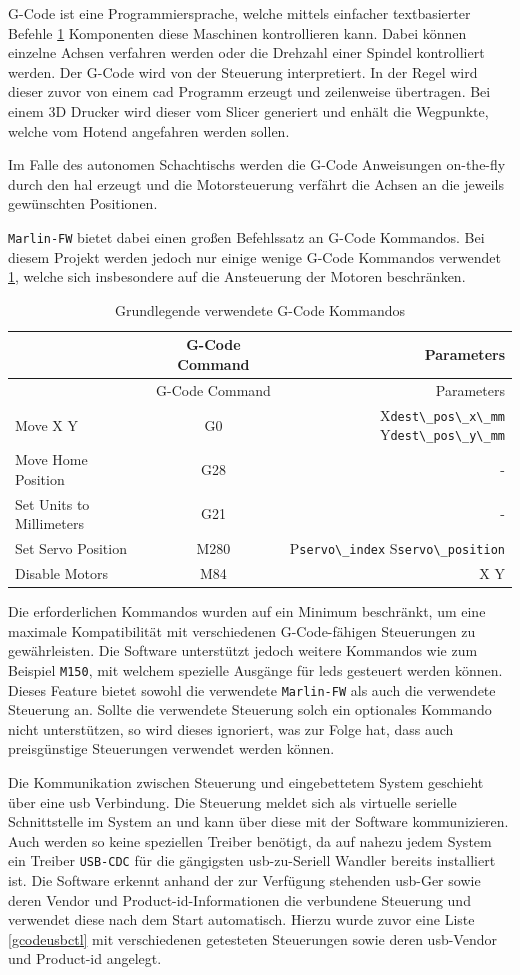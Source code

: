 G-Code ist eine Programmiersprache, welche mittels einfacher
textbasierter Befehle \ref{gcodecmd} Komponenten diese Maschinen
kontrollieren kann. Dabei können einzelne Achsen verfahren werden oder
die Drehzahl einer Spindel kontrolliert werden. Der G-Code wird von der
Steuerung interpretiert. In der Regel wird dieser zuvor von einem
\gls{cad} Programm erzeugt und zeilenweise übertragen. Bei einem 3D
Drucker wird dieser vom Slicer generiert und enhält die Wegpunkte,
welche vom Hotend angefahren werden sollen.

Im Falle des autonomen Schachtischs werden die G-Code Anweisungen
on-the-fly durch den \gls{hal} erzeugt und die Motorsteuerung verfährt
die Achsen an die jeweils gewünschten Positionen.

\passthrough{\lstinline!Marlin-FW!} bietet dabei einen großen
Befehlssatz an G-Code Kommandos. Bei diesem Projekt werden jedoch nur
einige wenige G-Code Kommandos verwendet \ref{gcodecmd}, welche sich
insbesondere auf die Ansteuerung der Motoren beschränken.

\begin{longtable}[]{@{}lcr@{}}
\caption{Grundlegende verwendete G-Code Kommandos
\label{gcodecmd}}\tabularnewline
\toprule
& G-Code Command & Parameters\tabularnewline
\midrule
\endfirsthead
\toprule
& G-Code Command & Parameters\tabularnewline
\midrule
\endhead
Move X Y & G0 & X\passthrough{\lstinline!dest\_pos\_x\_mm!}
Y\passthrough{\lstinline!dest\_pos\_y\_mm!}\tabularnewline
Move Home Position & G28 & -\tabularnewline
Set Units to Millimeters & G21 & -\tabularnewline
Set Servo Position & M280 & P\passthrough{\lstinline!servo\_index!}
S\passthrough{\lstinline!servo\_position!}\tabularnewline
Disable Motors & M84 & X Y\tabularnewline
\bottomrule
\end{longtable}

Die erforderlichen Kommandos wurden auf ein Minimum beschränkt, um eine
maximale Kompatibilität mit verschiedenen G-Code-fähigen Steuerungen zu
gewährleisten. Die Software unterstützt jedoch weitere Kommandos wie zum
Beispiel \passthrough{\lstinline!M150!}, mit welchem spezielle Ausgänge
für \gls{led}s gesteuert werden können. Dieses Feature bietet sowohl die
verwendete \passthrough{\lstinline!Marlin-FW!} als auch die verwendete
Steuerung an. Sollte die verwendete Steuerung solch ein optionales
Kommando nicht unterstützen, so wird dieses ignoriert, was zur Folge
hat, dass auch preisgünstige Steuerungen verwendet werden können.

Die Kommunikation zwischen Steuerung und eingebettetem System geschieht
über eine \gls{usb} Verbindung. Die Steuerung meldet sich als virtuelle
serielle Schnittstelle im System an und kann über diese mit der Software
kommunizieren. Auch werden so keine speziellen Treiber benötigt, da auf
nahezu jedem System ein Treiber \passthrough{\lstinline!USB-CDC!} für
die gängigsten \gls{usb}-zu-Seriell Wandler bereits installiert ist. Die
Software erkennt anhand der zur Verfügung stehenden \gls{usb}-Ger sowie
deren Vendor und Product-\gls{id}-Informationen die verbundene Steuerung
und verwendet diese nach dem Start automatisch. Hierzu wurde zuvor eine
Liste \ref{gcodeusbctl} mit verschiedenen getesteten Steuerungen sowie
deren \gls{usb}-Vendor und Product-\gls{id} angelegt.


